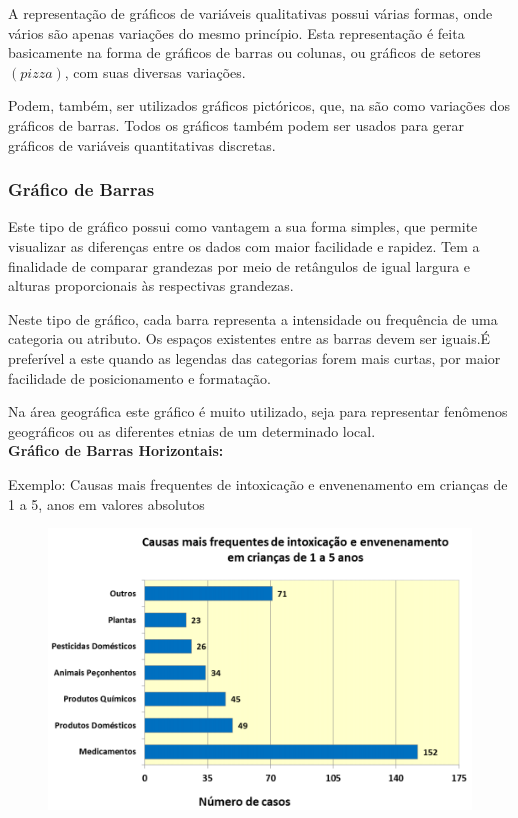 \documentclass[
	12pt,				%
	oneside,			%
	a4paper,			%
	english,			%
	french,				%
	spanish,			%
	brazil,				%
	]{abntex2}
\begin{document}
A representação de gráficos de variáveis qualitativas possui várias formas,
onde vários são apenas variações do mesmo princípio. Esta representação é feita basicamente na forma de gráficos de barras ou
colunas, ou gráficos de setores $(pizza)$, com suas diversas variações.\cite{variaveis1}

Podem, também, ser utilizados gráficos pictóricos, que, na são como variações
dos gráficos de barras. Todos os gráficos também podem ser usados para gerar gráficos de variáveis
quantitativas discretas.

\subsubsection{Gráfico de Barras}

Este tipo de gráfico possui como vantagem a sua forma simples, que permite visualizar as diferenças entre os dados com maior facilidade e rapidez. Tem a finalidade de comparar grandezas por meio de retângulos de igual largura e alturas proporcionais às respectivas grandezas.

Neste tipo de gráfico, cada barra representa a intensidade ou frequência de uma categoria ou atributo. Os espaços existentes entre as barras devem ser iguais.É preferível a este quando as legendas das categorias forem mais curtas, por maior facilidade de posicionamento e formatação.\cite{variaveis1}

Na área geográfica este gráfico é muito utilizado, seja para representar fenômenos geográficos ou as diferentes etnias de um determinado local. \\


\textbf{Gráfico de Barras Horizontais:}

Exemplo: Causas mais frequentes de intoxicação e envenenamento em crianças de 1 a 5, anos em valores absolutos

\begin{figure}[H]
\begin{center}

\includegraphics[scale=0.9]{grafico.jpg}  

\end{center}
\end{figure}
\end{document}
